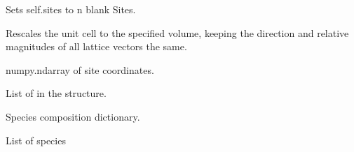 \documentclass[letterpaper,10pt,english]{sphinxmanual}
\begin{document}
\begin{fulllineitems}
\begin{fulllineitems}
\end{fulllineitems}


\begin{fulllineitems}
\label{models:qmpy.Structure.set_nsites}
Sets self.sites to n blank Sites.

\end{fulllineitems}


\begin{fulllineitems}
\label{models:qmpy.Structure.set_volume}
Rescales the unit cell to the specified volume, keeping the direction
and relative magnitudes of all lattice vectors the same.

\end{fulllineitems}


\begin{fulllineitems}
\label{models:qmpy.Structure.site_coords}
numpy.ndarray of site coordinates.

\end{fulllineitems}


\begin{fulllineitems}
\label{models:qmpy.Structure.sites}
List of  in the structure.

\end{fulllineitems}


\begin{fulllineitems}
\label{models:qmpy.Structure.spec_comp}
Species composition dictionary.

\end{fulllineitems}


\begin{fulllineitems}
\label{models:qmpy.Structure.species}
List of species

\end{fulllineitems}


\end{fulllineitems}
\end{document}
